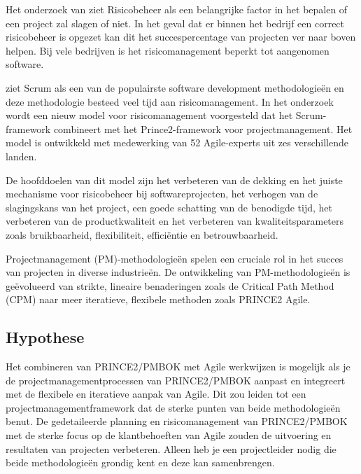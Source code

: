 \documentclass[dutch]{hogent-article}
\begin{document}
Het onderzoek van \textcite{Mousaei2018} ziet Risicobeheer als een belangrijke factor in het \linebreak bepalen of een project zal slagen of niet. In het geval dat er binnen het bedrijf een correct risicobeheer is opgezet kan dit het succespercentage van projecten ver naar boven helpen. Bij vele bedrijven is het risicomanagement beperkt tot aangenomen software.
\newline 
\newline 
\newline 
\newline 

\textcite{Mousaei2018} ziet Scrum als een van de populairste software development \linebreak methodologieën en deze methodologie besteed veel tijd aan risicomanagement. In het onderzoek wordt een nieuw model voor risicomanagement voorgesteld dat het Scrum-framework combineert met het Prince2-framework voor projectmanagement. Het model is ontwikkeld met medewerking van 52 Agile-experts uit zes verschillende landen.
\newline

 De hoofddoelen van dit model zijn het verbeteren van de dekking en het juiste mechanisme voor risicobeheer bij softwareprojecten, het verhogen van de slagingskans van het project, een goede \linebreak schatting  van de benodigde tijd, het verbeteren van de productkwaliteit en het verbeteren van \linebreak kwaliteitsparameters zoals bruikbaarheid, flexibiliteit, efficiëntie en betrouwbaarheid.\autocite{Mousaei2018}
 \newline
 
 Projectmanagement (PM)-methodologieën spelen een cruciale rol in het succes van projecten in diverse industrieën. De ontwikkeling van PM-methodologieën is geëvolueerd van strikte, lineaire benaderingen zoals de Critical Path Method (CPM) naar meer iteratieve, flexibele methoden zoals PRINCE2 Agile.\autocite{Demianchuk2020} 
 \newline
 
\subsection{Hypothese}
\label{sec:hypothese}
Het combineren van PRINCE2/PMBOK met Agile werkwijzen is mogelijk als je de projectmanagementprocessen van PRINCE2/PMBOK
aanpast en integreert met de flexibele en iteratieve aanpak van Agile. Dit zou leiden tot een projectmanagementframework dat de sterke punten van beide methodologieën benut.
De gedetaileerde planning en risicomanagement van PRINCE2/PMBOK met de sterke focus op de klantbehoeften van Agile zouden de uitvoering en resultaten van projecten verbeteren.
Alleen heb je een projectleider nodig die beide methodologieën grondig kent en deze kan samenbrengen.
\end{document}
